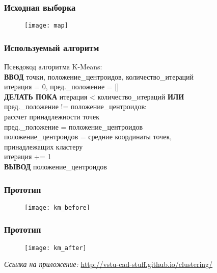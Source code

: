 \begin{frame}
    \frametitle{Исходная выборка}
    \begin{figure}
        \center
        \texttt{[image: map]}
    \end{figure}
\end{frame}

\begin{frame}
    \frametitle{Используемый алгоритм}
    Псевдокод алгоритма K-Means:\\
    \vspace{1em}
    \footnotesize
    \textbf{ВВОД} точки, положение\_центроидов, количество\_итераций\\
    итерация = 0, пред.\_положение = []\\
    \textbf{ДЕЛАТЬ ПОКА} итерация < количество\_итераций
    \textbf{ИЛИ} \\ \hspace{.15cm} пред.\_положение != положение\_центроидов:\\
    \hspace{.5cm} рассчет принадлежности точек\\
    \hspace{.5cm} пред.\_положение = положение\_центроидов\\
    \hspace{.5cm} положение\_центроидов = средние координаты точек,\\
    \hspace{4.8cm}принадлежащих кластеру\\
    \hspace{.5cm} итерация += 1\\
    \textbf{ВЫВОД} положение\_центроидов
\end{frame}

\begin{frame}
    \frametitle{Прототип}
    \begin{figure}
        \center
        \texttt{[image: km\_before]}
    \end{figure}
\end{frame}

\begin{frame}
    \frametitle{Прототип}
    \begin{figure}
        \center
        \texttt{[image: km\_after]}
    \end{figure}
    \small\emph{Ссылка на приложение:} \url{http://vstu-cad-stuff.github.io/clustering/}
\end{frame}

